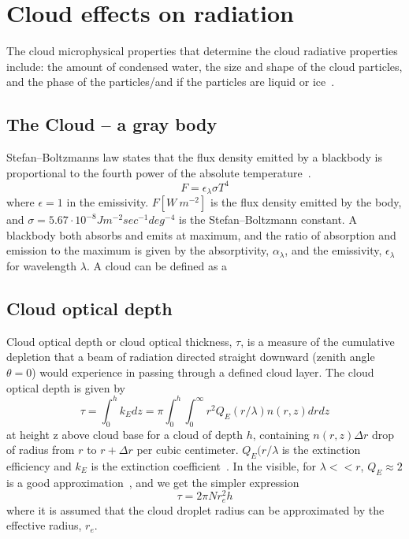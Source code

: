 \section{Cloud effects on radiation}
The cloud microphysical properties that determine the cloud radiative properties include: the amount of condensed water, the size and shape of the cloud particles, and the phase of the particles/and if the particles are liquid or ice~\citep{Curry1996}.
\subsection{The Cloud -- a gray body}
Stefan–Boltzmanns law states that the flux density emitted by a blackbody is proportional to the fourth power of the absolute temperature~\citep{Liou2002}. 
\begin{equation}
F = \epsilon_{\lambda} \sigma T^4
\end{equation}
where $\epsilon = 1$ in the emissivity. $F [W~m^{-2}]$ is the flux density emitted  by the body, and $\sigma = 5.67\cdot 10^{-8} Jm^{-2}sec^{-1}deg^{-4}$ is the Stefan–Boltzmann constant. A blackbody both absorbs and emits at maximum, and the ratio of absorption and emission to the maximum is given by the absorptivity, $\alpha_{\lambda}$, and the emissivity, $\epsilon_{\lambda}$ for wavelength $\lambda$.
A cloud can be defined as a 

\subsection{Cloud optical depth}
Cloud optical depth or cloud optical thickness, $\tau$, is a measure of the cumulative depletion that a beam of radiation directed straight downward (zenith angle $\theta = 0$) would experience in passing through a defined cloud layer. The cloud optical depth is given by~\citep{Twomey1977}
\begin{equation}
\tau = \int_0^h k_{E}dz = \pi \int_0^h \int_0^{\infty}r^2Q_E(r/\lambda)n(r,z)drdz
\end{equation}
at height z above cloud base for a cloud of depth $h$, containing $n(r,z)\Delta r$ drop of radius from $r$ to $r+\Delta r$ per cubic centimeter. 
$Q_E(r/\lambda$ is the extinction efficiency and $k_{E}$ is the extinction coefficient~\citep{Twomey1977}. In the visible, for $\lambda<<r$, $Q_E\approx 2$ is a good approximation~\citep{Liou2002}, and we get the simpler expression
\begin{equation}
\tau = 2\pi N r_e^2h
\end{equation}
where it is assumed that the cloud droplet radius can be approximated by the effective radius, $r_e$.

